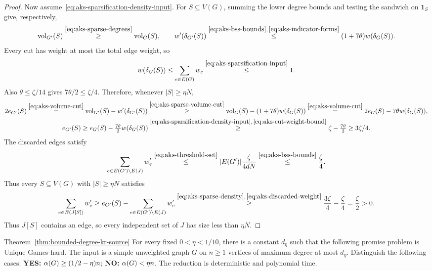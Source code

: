 \begin{proof}
Now assume~\eqref{eq:aks-sparsification-density-input}.
For $S\subseteq V(G)$, summing the lower degree bounds and testing the sandwich on
$\mathbf1_S$ give, respectively,
\begin{equation}\label{eq:aks-sparse-volume-cut}
\operatorname{vol}_{G'}(S)\overset{\eqref{eq:aks-sparse-degrees}}{\geq}\operatorname{vol}_G(S),
 \qquad w'(\delta_{G'}(S))
 \overset{\eqref{eq:aks-bss-bounds},\,\eqref{eq:aks-indicator-forms}}{\leq}
 (1+7\theta)w(\delta_G(S)).
\end{equation}
Every cut has weight at most the total edge weight, so
\begin{equation}\label{eq:aks-cut-weight-bound}
 w(\delta_G(S))\le\sum_{e\in E(G)}w_e
 \overset{\eqref{eq:aks-sparsification-input}}{\leq}1.
\end{equation}
Also $\theta\le\zeta/14$ gives $7\theta/2\leq\zeta/4$.
Therefore, whenever $|S|\ge\eta N$,
\begin{equation}\label{eq:aks-sparse-density}
\begin{gathered}
 2e_{G'}(S)\overset{\eqref{eq:aks-volume-cut}}{=}
 \operatorname{vol}_{G'}(S)-w'(\delta_{G'}(S)) \overset{\eqref{eq:aks-sparse-volume-cut}}{\geq}
 \operatorname{vol}_G(S)-(1+7\theta)w(\delta_G(S))
  \overset{\eqref{eq:aks-volume-cut}}{=}2e_G(S)-7\theta w(\delta_G(S)),\\
 e_{G'}(S)\ge e_G(S)-\tfrac{7\theta}{2}w(\delta_G(S))
  \overset{\eqref{eq:aks-sparsification-density-input},\,\eqref{eq:aks-cut-weight-bound}}{\geq}
 \zeta-\tfrac{7\theta}{2}\ge3\zeta/4.
\end{gathered}
\end{equation}
The discarded edges satisfy
\begin{equation}\label{eq:aks-discarded-weight}
 \sum_{e\in E(G')\setminus E(J)}w'_e
 \overset{\eqref{eq:aks-threshold-set}}{\leq}|E(G')|\frac{\zeta}{4dN}
 \overset{\eqref{eq:aks-bss-bounds}}{\leq}\frac\zeta4.
\end{equation}
Thus every $S\subseteq V(G)$ with $|S|\ge\eta N$ satisfies
\[
\sum_{e\in E(J[S])}w'_e
 \ge e_{G'}(S)-\sum_{e\in E(G')\setminus E(J)}w'_e
  \overset{\eqref{eq:aks-sparse-density},\,\eqref{eq:aks-discarded-weight}}{\geq}
 \frac{3\zeta}4-\frac\zeta4=\frac\zeta2>0.
\]
Thus $J[S]$ contains an edge, so every independent set of $J$ has
size less than $\eta N$.

\end{proof}

\begin{restatedtheorem}{Theorem~\ref{thm:bounded-degree-kr-source}}
For every fixed $0<\eta<1/10$, there is a constant
$d_\eta$ such that the following promise problem is Unique Games-hard.
The input is a simple unweighted graph $G$ on $n\geq1$ vertices
of maximum degree at most $d_\eta$. Distinguish the following cases:
\textbf{YES:} $\alpha(G)\geq(1/2-\eta)n$;
\textbf{NO:} $\alpha(G)<\eta n$.
The reduction is deterministic and polynomial time.
\end{restatedtheorem}

